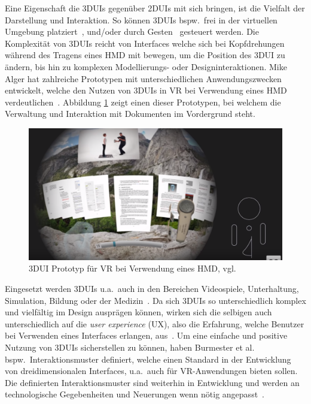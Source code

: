 \noindent Eine Eigenschaft die 3DUIs gegenüber 2DUIs mit sich bringen, ist die Vielfalt der Darstellung und Interaktion. So können 3DUIs bspw.~frei in der virtuellen Umgebung platziert~\cite{anintroductionto3dspacial}, und/oder durch Gesten~\cite{introduction3dgesturalinterfaces} gesteuert werden. Die Komplexität von 3DUIs reicht von Interfaces welche sich bei Kopfdrehungen während des Tragens eines HMD mit bewegen, um die Position des 3DUI zu ändern, bis hin zu komplexen Modellierungs- oder Designinteraktionen. Mike Alger hat zahlreiche Prototypen mit unterschiedlichen Anwendungszwecken entwickelt, welche den Nutzen von 3DUIs in VR bei Verwendung eines HMD verdeutlichen~\citep{mikealger}. Abbildung \ref{fig:mikealger} zeigt einen dieser Prototypen, bei welchem die Verwaltung und Interaktion mit Dokumenten im Vordergrund steht.

\begin{figure}[h]
\captionsetup{width=.7\linewidth}
\includegraphics[scale=0.3]{Bilder/Hauptteil/mikealger3dui}
\centering
\caption{3DUI Prototyp für VR bei Verwendung eines HMD, vgl.~\citep{mikealger}}
\label{fig:mikealger}
\end{figure}

\noindent Eingesetzt werden 3DUIs u.a.~auch in den Bereichen Videospiele, Unterhaltung, Simulation, Bildung oder der Medizin~\cite{theoryandpracticebook}. Da sich 3DUIs so unterschiedlich komplex und vielfältig im Design ausprägen können, wirken sich die selbigen auch unterschiedlich auf die \textit{user experience} (UX), also die Erfahrung, welche Benutzer bei Verwenden eines Interfaces erlangen, aus~\citep{constraints3duis}. Um eine einfache und positive Nutzung von 3DUIs sicherstellen zu können, haben Burmester et al.~ bspw.~Interaktionsmuster definiert, welche einen Standard in der Entwicklung von dreidimensionalen Interfaces, u.a.~auch für VR-Anwendungen bieten sollen. Die definierten Interaktionsmuster sind weiterhin in Entwicklung und werden an technologische Gegebenheiten und Neuerungen wenn nötig angepasst~\cite{interactionpatterns}.

